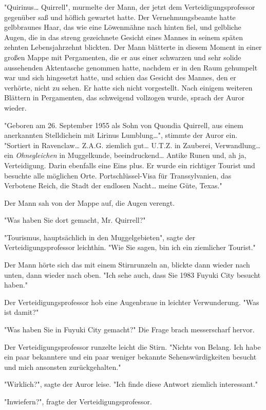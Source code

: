 {"Quirinus… Quirrell", murmelte der Mann, der jetzt dem Verteidigungsprofessor gegenüber saß und höflich gewartet hatte. Der Vernehmungsbeamte hatte gelbbraunes Haar, das wie eine Löwenmähne nach hinten fiel, und gelbliche Augen, die in das streng gezeichnete Gesicht eines Mannes in seinem späten zehnten Lebensjahrzehnt blickten. Der Mann blätterte in diesem Moment in einer großen Mappe mit Pergamenten, die er aus einer schwarzen und sehr solide aussehenden Aktentasche genommen hatte, nachdem er in den Raum gehumpelt war und sich hingesetzt hatte, und schien das Gesicht des Mannes, den er verhörte, nicht zu sehen. Er hatte sich nicht vorgestellt. Nach einigem weiteren Blättern in Pergamenten, das schweigend vollzogen wurde, sprach der Auror wieder.

"Geboren am 26. September 1955 als Sohn von Quondia Quirrell, aus einem anerkannten Stelldichein mit Lirinus Lumblung…", stimmte der Auror ein. "Sortiert in Ravenclaw… Z.A.G. ziemlich gut… U.T.Z. in Zauberei, Verwandlung… ein \emph{Ohnegleichen} in Muggelkunde, beeindruckend… Antike Runen und, ah ja, Verteidigung. Darin ebenfalls eine Eins plus. Er wurde ein richtiger Tourist und besuchte alle möglichen Orte. Portschlüssel-Visa für Transsylvanien, das Verbotene Reich, die Stadt der endlosen Nacht… meine Güte, Texas."

Der Mann sah von der Mappe auf, die Augen verengt.

"Was haben Sie dort gemacht, Mr. Quirrell?"

"Tourismus, hauptsächlich in den Muggelgebieten", sagte der Verteidigungsprofessor leichthin. "Wie Sie sagen, bin ich ein ziemlicher Tourist."

Der Mann hörte sich das mit einem Stirnrunzeln an, blickte dann wieder nach unten, dann wieder nach oben. "Ich sehe auch, dass Sie 1983 Fuyuki City besucht haben."

Der Verteidigungsprofessor hob eine Augenbraue in leichter Verwunderung. "Was ist damit?"

"Was haben Sie in Fuyuki City gemacht?" Die Frage brach messerscharf hervor.

Der Verteidigungsprofessor runzelte leicht die Stirn. "Nichts von Belang. Ich habe ein paar bekanntere und ein paar weniger bekannte Sehenswürdigkeiten besucht und mich ansonsten zurückgehalten."

"Wirklich?", sagte der Auror leise. "Ich finde diese Antwort ziemlich interessant."

"Inwiefern?", fragte der Verteidigungsprofessor.

}
